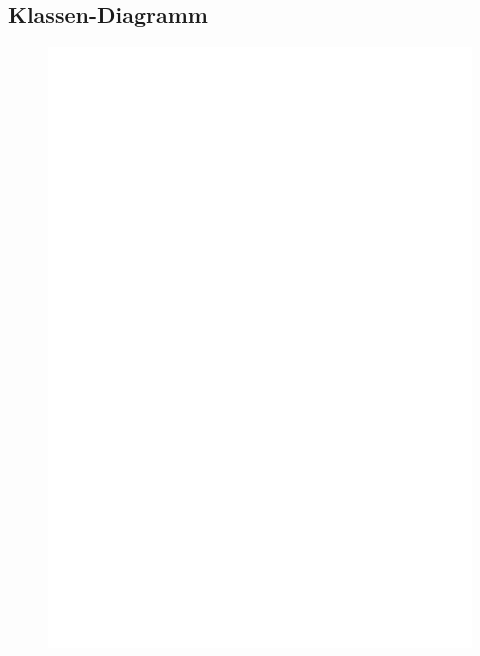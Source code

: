\subsection{Klassen-Diagramm}

    \begin{figure}[H]
        \centering
        \includegraphics[scale=0.75]{images/Kommunikator.pdf}
    \end{figure}